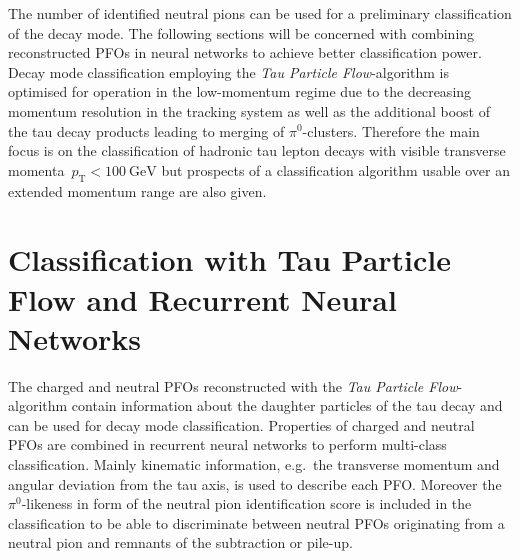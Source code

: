 The number of identified neutral pions can be used for a preliminary
classification of the decay mode. The following sections will be concerned with
combining reconstructed PFOs in neural networks to achieve better classification
power. Decay mode classification employing the \emph{Tau Particle
  Flow}-algorithm is optimised for operation in the low-momentum regime due to
the decreasing momentum resolution in the tracking system as well as the
additional boost of the tau decay products leading to merging of
$\pi^0$-clusters. Therefore the main focus is on the classification of hadronic
tau lepton decays with visible transverse
momenta~$p_\text{T} < \SI{100}{\giga\electronvolt}$ but prospects of a
classification algorithm usable over an extended momentum range are also given.

\section{Classification with Tau Particle Flow and Recurrent Neural Networks}
\label{sec:pfo_general}

The charged and neutral PFOs reconstructed with the \emph{Tau Particle
  Flow}-algorithm contain information about the daughter particles of the tau
decay and can be used for decay mode classification. Properties of charged and
neutral PFOs are combined in recurrent neural networks to perform multi-class
classification. Mainly kinematic information, e.g.\ the transverse momentum and
angular deviation from the tau axis, is used to describe each PFO. Moreover the
$\pi^0$-likeness in form of the neutral pion identification score is included in
the classification to be able to discriminate between neutral PFOs originating
from a neutral pion and remnants of the subtraction or pile-up.


